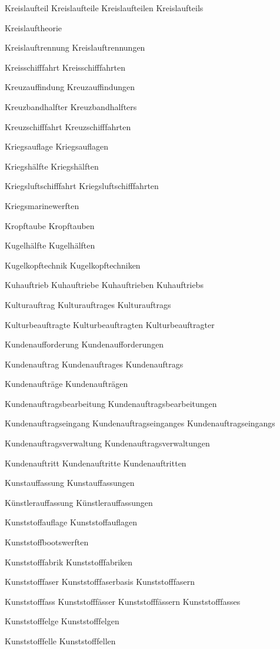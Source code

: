 Kreislaufteil
Kreislaufteile
Kreislaufteilen
Kreislaufteils

Kreislauftheorie

Kreislauftrennung
Kreislauftrennungen

Kreisschifffahrt
Kreisschifffahrten

Kreuzauffindung
Kreuzauffindungen

Kreuzbandhalfter
Kreuzbandhalfters

Kreuzschifffahrt
Kreuzschifffahrten

Kriegsauflage
Kriegsauflagen

Kriegshälfte
Kriegshälften

Kriegsluftschifffahrt
Kriegsluftschifffahrten

Kriegsmarinewerften

Kropftaube
Kropftauben

Kugelhälfte
Kugelhälften

Kugelkopftechnik
Kugelkopftechniken

Kuhauftrieb
Kuhauftriebe
Kuhauftrieben
Kuhauftriebs

Kulturauftrag
Kulturauftrages
Kulturauftrags

Kulturbeauftragte
Kulturbeauftragten
Kulturbeauftragter

Kundenaufforderung
Kundenaufforderungen

Kundenauftrag
Kundenauftrages
Kundenauftrags

Kundenaufträge
Kundenaufträgen

Kundenauftragsbearbeitung
Kundenauftragsbearbeitungen

Kundenauftragseingang
Kundenauftragseinganges
Kundenauftragseingangs

Kundenauftragsverwaltung
Kundenauftragsverwaltungen

Kundenauftritt
Kundenauftritte
Kundenauftritten

Kunstauffassung
Kunstauffassungen

Künstlerauffassung
Künstlerauffassungen

Kunststoffauflage
Kunststoffauflagen

Kunststoffbootswerften

Kunststofffabrik
Kunststofffabriken

Kunststofffaser
Kunststofffaserbasis
Kunststofffasern

Kunststofffass
Kunststofffässer
Kunststofffässern
Kunststofffasses

Kunststofffelge
Kunststofffelgen

Kunststofffelle
Kunststofffellen

